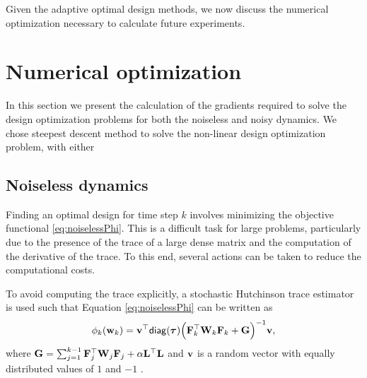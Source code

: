 \documentclass[11pt]{article}
\newcommand{\bfF}	{{\bf{F}}}
\newcommand{\bfG}	{{\bf{G}}}
\newcommand{\bfL}	{{\bf{L}}}
\newcommand{\bfW}	{{\bf{W}}}
\newcommand{\bfv}	{{\bf{v}}}
\newcommand{\bfw}	{{\bf{w}}}
\newcommand{\bftau}      {{\boldsymbol \tau}}
\newcommand{\LtL}       { \bfL^{\top}\bfL}
\begin{document}
Given the adaptive optimal design  methods, we now discuss the numerical optimization necessary to calculate future experiments.




\section{Numerical optimization}
In this section we present the calculation of the gradients required to solve the design optimization problems for both the noiseless and noisy dynamics. We chose steepest descent method to solve the non-linear design optimization problem, with either 
\label{sec:Opt}
\subsection{Noiseless dynamics}
Finding an optimal design for  time step $k$ involves minimizing the objective functional \eqref{eq:noiselessPhi}. 
This is a difficult task for large problems, particularly due to the presence of the trace of a large dense matrix and the computation of the derivative of the trace. To this end, several actions can be taken to reduce the computational costs.

To avoid computing the trace explicitly, a stochastic Hutchinson trace estimator  is used  such that Equation \eqref{eq:noiselessPhi} can be written as
\begin{equation*}
\phi_k(\bfw_k) = \bfv^{\top}{\sf diag}(\bftau) \Big(\bfF_k^{\top}\bfW_k\bfF_k   + \bfG \Big)^{-1}\bfv,
\end{equation*}
where $\bfG = \sum_{j=1}^{k-1}\bfF_{j}^{\top}\bfW_{j}\bfF_{j}+ \alpha\LtL$ and $\bfv$ is a random vector with equally distributed values of $1$ and $-1$ \cite{Hutchinson1990}. 
\end{document}
